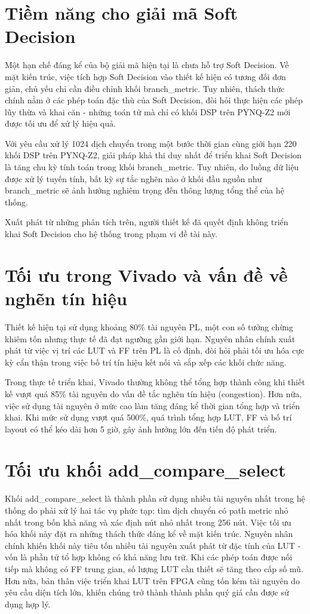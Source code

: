 \documentclass[../DoAn.tex]{subfiles}
\begin{document}
\section{Tiềm năng cho giải mã Soft Decision}

Một hạn chế đáng kể của bộ giải mã hiện tại là chưa hỗ trợ Soft Decision. Về mặt kiến trúc, việc tích hợp Soft Decision vào thiết kế hiện có tương đối đơn giản, chủ yếu chỉ cần điều chỉnh khối branch\_metric. Tuy nhiên, thách thức chính nằm ở các phép toán đặc thù của Soft Decision, đòi hỏi thực hiện các phép lũy thừa và khai căn - những toán tử mà chỉ có khối DSP trên PYNQ-Z2 mới được tối ưu để xử lý hiệu quả.

Với yêu cầu xử lý 1024 dịch chuyển trong một bước thời gian cùng giới hạn 220 khối DSP trên PYNQ-Z2, giải pháp khả thi duy nhất để triển khai Soft Decision là tăng chu kỳ tính toán trong khối branch\_metric. Tuy nhiên, do luồng dữ liệu được xử lý tuyến tính, bất kỳ sự tắc nghẽn nào ở khối đầu nguồn như branch\_metric sẽ ảnh hưởng nghiêm trọng đến thông lượng tổng thể của hệ thống.

Xuất phát từ những phân tích trên, người thiết kế đã quyết định không triển khai Soft Decision cho hệ thống trong phạm vi đề tài này.

\section{Tối ưu trong Vivado và vấn đề về nghẽn tín hiệu}

Thiết kế hiện tại sử dụng khoảng 80\% tài nguyên PL, một con số tưởng chừng khiêm tốn nhưng thực tế đã đạt ngưỡng gần giới hạn. Nguyên nhân chính xuất phát từ việc vị trí các LUT và FF trên PL là cố định, đòi hỏi phải tối ưu hóa cực kỳ cẩn thận trong việc bố trí tín hiệu kết nối và sắp xếp các khối chức năng.

Trong thực tế triển khai, Vivado thường không thể tổng hợp thành công khi thiết kế vượt quá 85\% tài nguyên do vấn đề tắc nghẽn tín hiệu (congestion). Hơn nữa, việc sử dụng tài nguyên ở mức cao làm tăng đáng kể thời gian tổng hợp và triển khai. Khi mức sử dụng vượt quá 500\%, quá trình tổng hợp LUT, FF và bố trí layout có thể kéo dài hơn 5 giờ, gây ảnh hưởng lớn đến tiến độ phát triển.
\section{Tối ưu khối add\_compare\_select}
\label{section:Tối ưu khối add_compare_select}

Khối add\_compare\_select là thành phần sử dụng nhiều tài nguyên nhất trong hệ thống do phải xử lý hai tác vụ phức tạp: tìm dịch chuyển có path metric nhỏ nhất trong bốn khả năng và xác định nút nhỏ nhất trong 256 nút. Việc tối ưu hóa khối này đặt ra những thách thức đáng kể về mặt kiến trúc. Nguyên nhân chính khiến khối này tiêu tốn nhiều tài nguyên xuất phát từ đặc tính của LUT - vốn là phần tử tổ hợp không có khả năng lưu trữ. Khi các phép toán được nối tiếp mà không có FF trung gian, số lượng LUT cần thiết sẽ tăng theo cấp số mũ. Hơn nữa, bản thân việc triển khai LUT trên FPGA cũng tốn kém tài nguyên do yêu cầu diện tích lớn, khiến chúng trở thành thành phần quý giá cần được sử dụng hợp lý.
\end{document}
